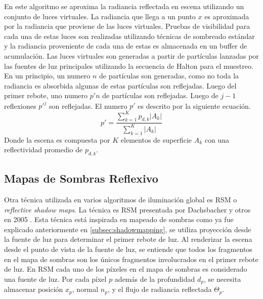 En este algoritmo se aproxima la radiancia reflectada en escena utilizando un conjunto de luces virtuales. La radiancia que llega a un punto $x$ es aproximada por la radiancia que proviene de las luces virtuales. Pruebas de visibilidad para cada una de estas luces son realizadas utilizando técnicas de sombreado estándar y la radiancia proveniente de cada una de estas es almacenada en un buffer de acumulación.
Las luces virtuales son generadas a partir de partículas lanzadas por las fuentes de luz principales utilizando la secuencia de Halton para el muestreo. En un principio, un numero $n$ de partículas son generadas, como no toda la radiancia es absorbida algunas de estas partículas son reflejadas. Luego del primer rebote, uno numero $p'n$ de partículas son reflejadas. Luego de $j-1$ reflexiones $p'^j$ son reflejadas. El numero $p'$ es descrito por la siguiente ecuación.
\begin{equation}
    p' = \frac{\sum_{k=1}^{K} p_{d,k}|A_{k}|}{\sum_{k=1}^{K}|A_{k}|}
    \label{eq:reflected_vpls}
\end{equation}
Donde la escena es compuesta por $K$ elementos de superficie $A_{k}$ con una reflectividad promedio de $p_{d,k}$.

\subsection{Mapas de Sombras Reflexivo}
Otra técnica utilizada en varios algoritmos de iluminación global es \ac{RSM} o \emph{reflective shadow maps}. La técnica es \ac{RSM} presentada por Dachsbacher y otros en 2005 \cite{Dachsbacher:2005}.  Esta técnica está inspirada en mapeado de sombras como ya fue explicado anteriormente en \ref{subsec:shadowmapping}, se utiliza proyección desde la fuente de luz para determinar el primer rebote de luz. Al renderizar la escena desde el punto de vista de la fuente de luz, se entiende que todos los fragmentos en el mapa de sombras son los únicos fragmentos involucrados en el primer rebote de luz. En \ac{RSM} cada uno de los píxeles en el mapa de sombras es considerado una fuente de luz. Por cada píxel $p$ además de la profundidad $d_{p}$, se necesita almacenar posición $x_{p}$, normal $n_{p}$, y el flujo de radiancia reflectada $\Theta_{p}$.

